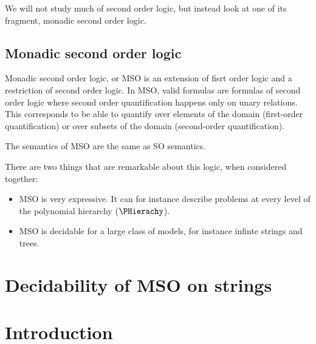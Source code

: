 We will not study much of second order logic, but instead
look at one of its fragment, monadic second order logic.

\subsection{Monadic second order logic}

Monadic second order logic, or MSO is an extension of
fisrt order logic and a restriction of second order logic.
In MSO, valid formulas are formulas of second order logic
where second order quantification happens only on unary relations.
This corresponds to be able to quantify over elements
of the domain (first-order quantification)
or over subsets of the domain (second-order quantification).

The semantics of MSO are the same as SO semantics.

There are two things that are remarkable about
this logic, when considered together:
\begin{itemize}
    \item MSO is very expressive. It can for instance
        describe problems at every level of the polynomial hierarchy ($\PHierachy$).
    \item MSO is decidable for a large class of models, for instance
        infinte strings and trees.
\end{itemize}


\section{Decidability of MSO on strings}






































\iffalse
\section{Introduction}

